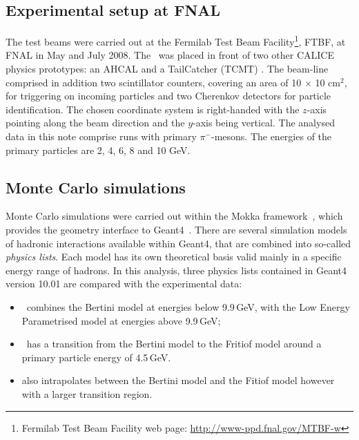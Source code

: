 \subsection{Experimental setup at FNAL}\label{sec:fnal}
The test beams were carried out at the Fermilab Test Beam Facility\footnote{\label{note1}Fermilab Test Beam Facility web page: \url{http://www-ppd.fnal.gov/MTBF-w}}, FTBF, at FNAL in May and July 2008.
The \ecal\ was placed in front of two other CALICE physics prototypes: an AHCAL \cite{collaboration:2010hb} and a TailCatcher (TCMT) \cite{CALICE:2012aa}.
The beam-line comprised in addition two scintillator counters, covering an area of 10 $\times$ 10 cm$^2$, for triggering on incoming particles and two Cherenkov detectors for particle identification.
The chosen coordinate system is right-handed with the $z$-axis pointing along the beam direction and the $y$-axis being vertical.
The analysed data in this note comprise runs with primary $\pi^-$-mesons. The energies of the primary particles are 2, 4, 6, 8 and 10 GeV.

\subsection{Monte Carlo simulations}

Monte Carlo simulations were carried out within the Mokka framework~\cite{MoradeFreitas:2002kj}, which provides the geometry interface to {\sc Geant}4~\cite{Allison:2006ve}. 
There are several simulation models of hadronic interactions available within {\sc Geant}4, that are combined into so-called \textit{physics lists}.
Each model has its own theoretical basis valid mainly in a specific energy range of hadrons. In this analysis, three physics lists contained in {\sc Geant4} version 10.01 are compared with the experimental data:
\begin{itemize}
	\item \qgsp\ combines the Bertini model
	at energies below 9.9\,GeV, with the Low Energy Parametrised model at energies above 9.9\,GeV;
	\item \ftfp\ has a transition from the Bertini model to the Fritiof model around a primary particle energy of 4.5\,GeV.
	\item \qbbc also intrapolates between the Bertini model and the Fitiof model however with a larger transition region.
\end{itemize}

